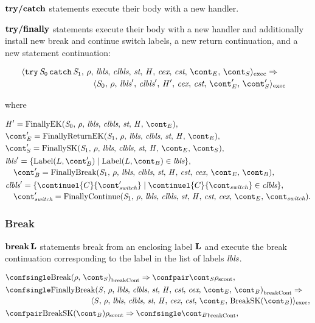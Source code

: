 \documentclass[a4paper,oneside]{article}
\newcommand{\synt}[1]{\ensuremath{\text{\textbf{#1}}}}
\DeclareMathOperator{\bbreak}{\synt{break}}
\newcommand{\cesktrans}[2]{\ensuremath{{#1} \Rightarrow {#2}}}
\newcommand{\cesktranssplit}[2]{\ensuremath{{#1} \Rightarrow\\ {#2}}}
\begin{document}
$\synt{try/catch}$ statements execute their body with a new handler.

$\synt{try/finally}$ statements execute their body with a new handler and additionally install new break and continue switch labels, a new return continuation, and a new statement continuation:

\begin{align*}
    &\begin{multlined}
        \cesktranssplit
            {\execconf{\TryFinally{\stmti{0}}{\stmti{1}}}{\env}{\lbls}{\clbls}{\strace}{\handler}{\cex,\,\cstrace}{\econt}{\scont}}%
            {\execconf{\stmti{0}}{\env}{\lbls'}{\clbls'}{\handler'}{\cex}{\cstrace}{\econt'}{\scont'}}
    \end{multlined}
\end{align*}

\noindent where

\begin{align*}
&\handler' = \FinallyK{\stmti{0}},\\
&\econt' = \FinallyReturnK{\stmti{1}},\\
&\scont' = \FinallySK{\stmti{1}},\\
&\begin{multlined}
    \lbls' = \lbrace \mathrm{Label}(L, \bcont') \mid \mathrm{Label}(L, \bcont) \in \lbls\rbrace,\\
    \bcont' = \FinallyBreak{\stmti{1}}{\bcont},
\end{multlined}\\
&\begin{multlined}
    \clbls' =  \lbrace \continuel{C}{\switchcont'} \mid  \continuel{C}{\switchcont} \in \clbls\rbrace,\\
    \switchcont' = \FinallyContinue{\stmti{1}}{\switchcont}.
\end{multlined}
\end{align*}


\subsubsection{Break}

$\bbreak \synt{L}$ statements break from an enclosing label $\synt{L}$ and execute the break continuation corresponding to the label in the list of labels $\textit{lbls}$.

\begin{align*}
    &\cesktrans%
        {\breakconf{\Break{\env}{\scont}}}%
        {\scontconf{\scont}{\env}},\\
    &\begin{multlined}
        \cesktranssplit%
            {\breakconf{\FinallyBreak{\stmt}{\bcont}}}%
            {\execconf{\stmt}{\env}{\lbls}{\clbls}{\strace}{\handler}{\cex,\,\cstrace}{\econt}{\mathrm{BreakSK}(\bcont)}},
    \end{multlined}\\
    &\cesktrans%
        {\scontconf{\mathrm{BreakSK}(\bcont)}{\env}}%
        {\breakconf{\bcont}},
\end{align*}
\end{document}
